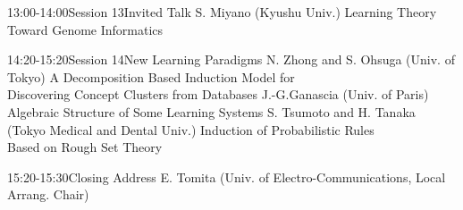 
\begin{session}{13:00-14:00}{Session 13}{Invited Talk}
\talk
{S. Miyano (Kyushu Univ.)}
{Learning Theory Toward Genome Informatics}
\end{session}


\begin{session}{14:20-15:20}{Session 14}{New Learning Paradigms}
\talk
{N. Zhong and S. Ohsuga (Univ. of Tokyo)}
{A Decomposition Based Induction Model for \\
 Discovering Concept Clusters from Databases}
\talk
{J.-G.Ganascia (Univ. of Paris)}
{Algebraic Structure of Some Learning Systems}
\talk
{S. Tsumoto and H. Tanaka (Tokyo Medical and Dental Univ.)}
{Induction of Probabilistic Rules  \\
 Based on Rough Set Theory}
\end{session}

\begin{session}{15:20-15:30}{Closing Address}{}
\talkA
{E. Tomita (Univ. of Electro-Communications, Local Arrang. Chair)}
\end{session}






\setlength{\topmargin}{-10.0mm}
\setlength{\oddsidemargin}{0pt}
\setlength{\evensidemargin}{0pt}
\setlength{\headheight}{0pt}
\setlength{\headsep}{12pt}
\setlength{\footheight}{12pt}
\setlength{\footskip}{30pt}
\setlength{\textheight}{720pt}
\setlength{\textwidth}{530pt}
\setlength{\columnsep}{10pt}
\setlength{\columnseprule}{0pt}
\setlength{\hoffset}{-15.0mm}
\setlength{\voffset}{3.0mm}
\renewcommand{\arraystretch}{0.9}
\pagestyle{empty}



